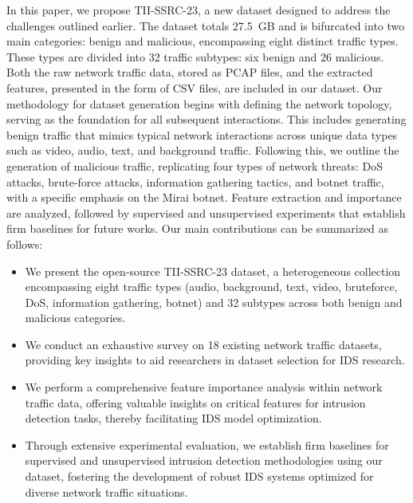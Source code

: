 \documentclass[lettersize,journal]{IEEEtran}
\begin{document}
In this paper, we propose TII-SSRC-23, a new dataset designed to address the challenges outlined earlier. The dataset totals 27.5~GB and is bifurcated into two main categories: benign and malicious, encompassing eight distinct traffic types. These types are divided into 32 traffic subtypes: six benign and 26 malicious. Both the raw network traffic data, stored as \ac{PCAP} files, and the extracted features, presented in the form of \ac{CSV} files, are included in our dataset. Our methodology for dataset generation begins with defining the network topology, serving as the foundation for all subsequent interactions. This includes generating benign traffic that mimics typical network interactions across unique data types such as video, audio, text, and background traffic. Following this, we outline the generation of malicious traffic, replicating four types of network threats: \ac{DoS} attacks, brute-force attacks, information gathering tactics, and botnet traffic, with a specific emphasis on the Mirai botnet. Feature extraction and importance are analyzed, followed by supervised and unsupervised experiments that establish firm baselines for future works. Our main contributions can be summarized as follows:
\begin{itemize}
\item We present the open-source TII-SSRC-23 dataset, a heterogeneous collection encompassing eight traffic types (audio, background, text, video, bruteforce, \ac{DoS}, information gathering, botnet) and 32 subtypes across both benign and malicious categories. 
\item We conduct an exhaustive survey on 18 existing network traffic datasets, providing key insights to aid researchers in dataset selection for IDS research.
\item We perform a comprehensive feature importance analysis within network traffic data, offering valuable insights on critical features for intrusion detection tasks, thereby facilitating IDS model optimization.
\item Through extensive experimental evaluation, we establish firm baselines for supervised and unsupervised intrusion detection methodologies using our dataset, fostering the development of robust IDS systems optimized for diverse network traffic situations.
\end{itemize} 
\end{document}
